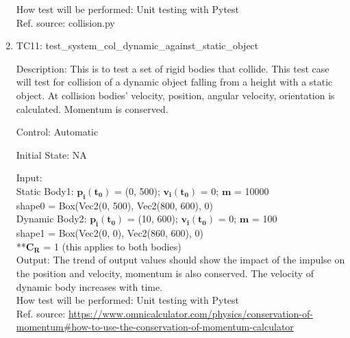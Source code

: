 \documentclass[12pt, titlepage]{article}
\begin{document}
\begin{enumerate}
	How test will be performed: Unit testing with Pytest\\
	Ref. source: collision.py
	
\item{TC11: test\_system\_col\_dynamic\_against\_static\_object\\}

Description: This is to test a set of rigid bodies that collide. This test case will test for collision of a dynamic object falling from a height with a static object. At collision bodies' velocity, position, angular velocity, orientation is calculated. Momentum is conserved. 

Control: Automatic

Initial State: NA

Input:\\

Static Body1: $\mathbf{p_i}$$\mathbf{(t_0)}$ = (0, 500); $\mathbf{v_i}$$\mathbf{(t_0)}$ = 0; $\mathbf{m}$ = 10000 \\
shape0 = Box(Vec2(0, 500), Vec2(800, 600), 0)\\ 
\newline
Dynamic Body2: $\mathbf{p_i}$$\mathbf{(t_0)}$ = (10, 600); $\mathbf{v_i}$$\mathbf{(t_0)}$ = 0; $\mathbf{m}$ = 100 \\ 
shape1 = Box(Vec2(0, 0), Vec2(860, 600), 0)\\

**$\mathbf{C_R}$$\mathbf{}$ = 1 (this applies to both bodies) \\

Output:  
The trend of output values should show the impact of the impulse on the position and velocity, momentum is also conserved. The velocity of dynamic body increases with time.\\

How test will be performed: Unit testing with Pytest\\
Ref. source: \url{https://www.omnicalculator.com/physics/conservation-of-momentum#how-to-use-the-conservation-of-momentum-calculator}
	

\end{enumerate}	
\end{document}
